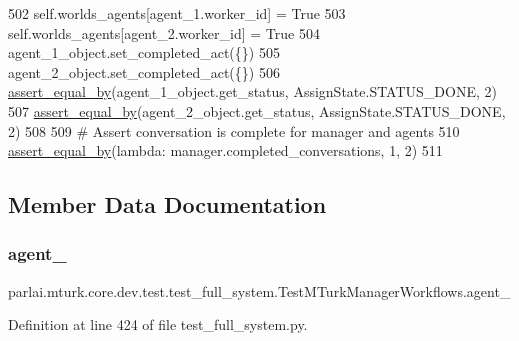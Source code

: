 \begin{DoxyCode}
502         self.worlds\_agents[agent\_1.worker\_id] = \textcolor{keyword}{True}
503         self.worlds\_agents[agent\_2.worker\_id] = \textcolor{keyword}{True}
504         agent\_1\_object.set\_completed\_act(\{\})
505         agent\_2\_object.set\_completed\_act(\{\})
506         \hyperlink{namespaceparlai_1_1mturk_1_1core_1_1test_1_1test__full__system_a0b463246d35658a2e422010f13dcf819}{assert\_equal\_by}(agent\_1\_object.get\_status, AssignState.STATUS\_DONE, 2)
507         \hyperlink{namespaceparlai_1_1mturk_1_1core_1_1test_1_1test__full__system_a0b463246d35658a2e422010f13dcf819}{assert\_equal\_by}(agent\_2\_object.get\_status, AssignState.STATUS\_DONE, 2)
508 
509         \textcolor{comment}{# Assert conversation is complete for manager and agents}
510         \hyperlink{namespaceparlai_1_1mturk_1_1core_1_1test_1_1test__full__system_a0b463246d35658a2e422010f13dcf819}{assert\_equal\_by}(\textcolor{keyword}{lambda}: manager.completed\_conversations, 1, 2)
511 
\end{DoxyCode}


\subsection{Member Data Documentation}
\mbox{\label{classparlai_1_1mturk_1_1core_1_1dev_1_1test_1_1test__full__system_1_1TestMTurkManagerWorkflows_abffb036c95f2b09e9582fcc9e8c4fae1}} 
\subsubsection{\texorpdfstring{agent\+\_}{agent\_1}}
{\footnotesize\ttfamily parlai.\+mturk.\+core.\+dev.\+test.\+test\+\_\+full\+\_\+system.\+Test\+M\+Turk\+Manager\+Workflows.\+agent\+\_}



Definition at line 424 of file test\+\_\+full\+\_\+system.\+py.

